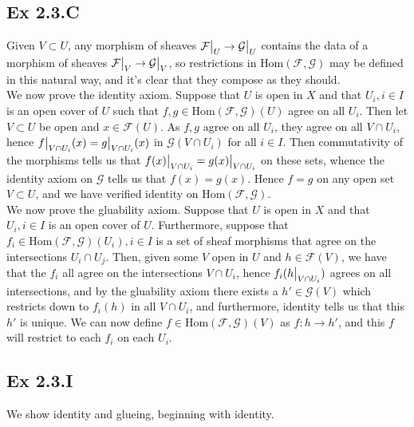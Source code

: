 \documentclass{article}
\newcommand\restr[2]{{%
  \left.\kern-\nulldelimiterspace %
  #1 %
  \vphantom{\big|} %
  \right|_{#2} %
  }}
\theoremstyle{definition}
\newcommand{\Hom}{\text{Hom}}
\begin{document}
\subsection*{Ex 2.3.C}

Given $V \subset U$, any morphism of sheaves $\restr{\mathcal{F}}{U} \to
	\restr{\mathcal{G}}{U}$ contains the data of a morphism of sheaves
$\restr{\mathcal{F}}{V} \to \restr{\mathcal{G}}{V}$, so restrictions in
$\Hom(\mathcal{F}, \mathcal{G})$ may be defined in this natural way, and it's
clear that they compose as they should. \\

We now prove the identity axiom. Suppose that $U$ is open in $X$ and that $U_i,
	i \in I$ is an open cover of $U$ such that $f, g \in \Hom(\mathcal{F},
	\mathcal{G})(U)$ agree on all $U_i$. Then let $V \subset U$ be open and $x \in
	\mathcal{F}(U)$. As $f, g$ agree on all $U_i$, they agree on all $V \cap U_i$,
hence $\restr{f}{V \cap U_i}(x) = \restr{g}{V \cap U_i}(x)$ in $\mathcal{G}(V
	\cap U_i)$ for all $i \in I$. Then commutativity of the morphisms tells us that
$\restr{f(x)}{V \cap U_i} = \restr{g(x)}{V \cap U_i}$ on these sets, whence the
identity axiom on $\mathcal{G}$ tells us that $f(x) = g(x)$. Hence $f = g$ on
any open set $V \subset U$, and we have verified identity on $\Hom(\mathcal{F},
	\mathcal{G})$. \\

We now prove the gluability axiom. Suppose that $U$ is open in $X$ and that
$U_i, i \in I$ is an open cover of $U$. Furthermore, suppose that $f_i \in
	\Hom(\mathcal{F}, \mathcal{G})(U_i), i \in I$ is a set of sheaf morphisms that
agree on the intersections $U_i \cap U_j$. Then, given some $V$ open in $U$ and
$h \in \mathcal{F}(V)$, we have that the $f_i$ all agree on the intersections
$V \cap U_i$, hence $f_i(\restr{h}{V \cap U_i})$ agrees on all intersections,
and by the gluability axiom there exists a $h' \in \mathcal{G}(V)$ which
restricts down to $f_i(h)$ in all $V \cap U_i$, and furthermore, identity tells
us that this $h'$ is unique. We can now define $f \in \Hom(\mathcal{F},
	\mathcal{G})(V)$ as $f : h \to h'$, and this $f$ will restrict to each $f_i$ on
each $U_i$.

\subsection*{Ex 2.3.I}

We show identity and glueing, beginning with identity. \\
\end{document}
